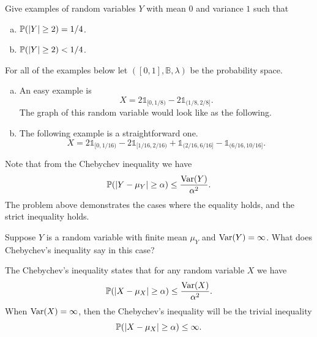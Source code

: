 \begin{problem}
	Give examples of random variables $ Y $ with mean $ 0 $ and variance $ 1 $ such that
	\begin{enumerate}[(a)]
		\item $ \mathbb{P}(|Y|\geq 2) = 1/4 $.
		\item $ \mathbb{P}(|Y|\geq 2) < 1/4 $.
	\end{enumerate}
\end{problem}
\begin{solution}
	For all of the examples below let $ ([0,1],\mathbb{B},\lambda) $ be the probability space.
	\begin{enumerate}[(a)]
		\item An easy example is
		\[ X = 2\mathds{1}_{[0,1/8)} -2\mathds{1}_{(1/8,2/8]}. \]
		The graph of this random variable would look like as the following.
		
		\FloatBarrier
		\item The following example is a straightforward one.
		\[ X = 2\mathds{1}_{[0,1/16)} - 2\mathds{1}_{[1/16,2/16)} + \mathds{1}_{(2/16,6/16]} - \mathds{1}_{(6/16,10/16]}. \]
		
	\end{enumerate}
\end{solution}
\begin{remark}
	Note that from the Chebychev inequality we have
	\[ \mathbb{P}(|Y - \mu_Y|\geq \alpha) \leq \frac{\operatorname{Var}(Y)}{\alpha^2}. \]
	The problem above demonstrates the cases where the equality holds, and the strict inequality holds.
\end{remark}

\begin{problem}
	Suppose $ Y $ is a random variable with finite mean $ \mu_Y $ and $ \operatorname{Var}(Y)=\infty $. What does Chebychev's inequality say in this case?
\end{problem}
\begin{solution}
	The Chebychev's inequality states that for any random variable $ X $ we have
	\[ \mathbb{P}(|X - \mu_X| \geq \alpha) \leq \frac{\operatorname{Var}(X)}{\alpha^2}. \]
	When $ \operatorname{Var}(X) = \infty $, then the Chebychev's inequality will be the trivial inequality
	\[ \mathbb{P}(|X - \mu_X|\geq \alpha) \leq \infty. \]
\end{solution}



